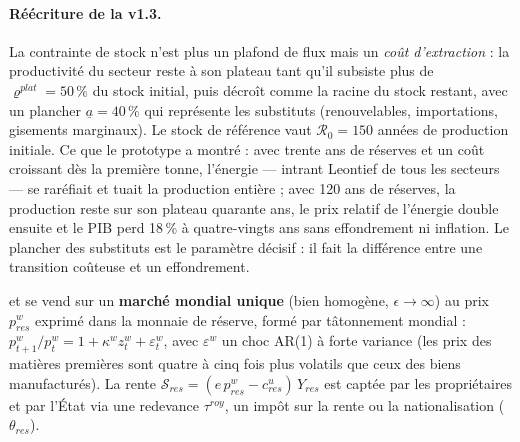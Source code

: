\documentclass[11pt,a4paper]{article}
\begin{document}
\begin{lecture}
\paragraph{Réécriture de la v1.3.} La contrainte de stock n'est plus un plafond de flux mais un \emph{coût d'extraction} : la productivité du secteur reste à son plateau tant qu'il subsiste plus de $\varrho^{plat}=50\,\%$ du stock initial, puis décroît comme la racine du stock restant, avec un plancher $\underline a=40\,\%$ qui représente les substituts (renouvelables, importations, gisements marginaux). Le stock de référence vaut $\mathcal{R}_0=150$ années de production initiale. Ce que le prototype a montré : avec trente ans de réserves et un coût croissant dès la première tonne, l'énergie — intrant Leontief de tous les secteurs — se raréfiait et tuait la production entière ; avec 120 ans de réserves, la production reste sur son plateau quarante ans, le prix relatif de l'énergie double ensuite et le PIB perd 18\,\% à quatre-vingts ans sans effondrement ni inflation. Le plancher des substituts est le paramètre décisif : il fait la différence entre une transition coûteuse et un effondrement.
\end{lecture}
et se vend sur un \textbf{marché mondial unique} (bien homogène, $\epsilon \to \infty$) au prix $p^w_{res}$ exprimé dans la monnaie de réserve, formé par tâtonnement mondial : $p^w_{t+1}/p^w_t = 1 + \kappa^w z^w_t + \varepsilon^w_t$, avec $\varepsilon^w$ un choc AR(1) à forte variance (les prix des matières premières sont quatre à cinq fois plus volatils que ceux des biens manufacturés). La rente $\mathcal{S}_{res} = (e\, p^w_{res} - c^u_{res})\, Y_{res}$ est captée par les propriétaires et par l'État via une redevance $\tau^{roy}$, un impôt sur la rente ou la nationalisation ($\theta_{res}$).
\end{document}
